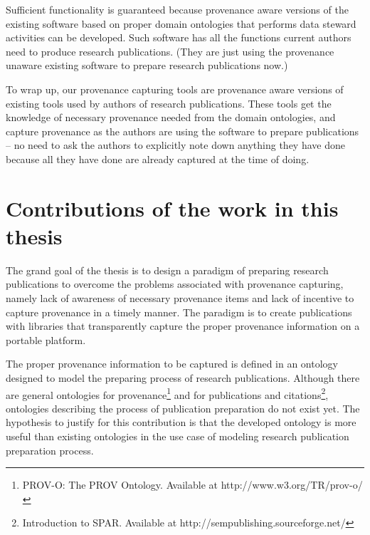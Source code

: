 Sufficient functionality is guaranteed because provenance aware versions of the existing software based on proper domain ontologies that performs data steward activities can be developed. Such software has all the functions current authors need to produce research publications. (They are just using the provenance unaware existing software to prepare research publications now.) 

To wrap up, our provenance capturing tools are provenance aware versions of existing tools used by authors of research publications. These tools get the knowledge of necessary provenance needed from the domain ontologies, and capture provenance as the authors are using the software to prepare publications -- no need to ask the authors to explicitly note down anything they have done because all they have done are already captured at the time of doing.

\section{Contributions of the work in this thesis}
\label{sec:contribution}
The grand goal of the thesis is to design a paradigm of preparing research publications to overcome the problems associated with provenance capturing, namely lack of awareness of necessary provenance items and lack of incentive to capture provenance in a timely manner. The paradigm is to create publications with libraries that transparently capture the proper provenance information on a portable platform.

The proper provenance information to be captured is defined in an ontology designed to model the preparing process of research publications. Although there are general ontologies for provenance\footnote{PROV-O: The PROV Ontology. Available at http://www.w3.org/TR/prov-o/} and for publications and citations\footnote{Introduction to SPAR. Available at http://sempublishing.sourceforge.net/}, ontologies describing the process of publication preparation do not exist yet. The hypothesis to justify for this contribution is that the developed ontology is more useful than existing ontologies in the use case of modeling research publication preparation process.

